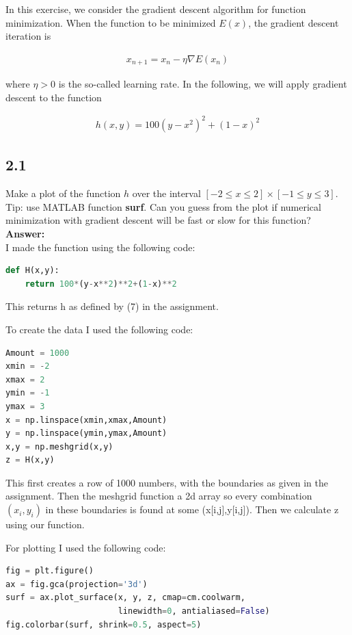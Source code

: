 \documentclass[a4paper]{article}
\begin{document}
In this exercise, we consider the gradient descent algorithm for function minimization. When the function to be minimized $E(x)$, the gradient descent iteration is

\begin{align*}
	x_{n+1} = x_n - \eta \nabla E(x_n)
\end{align*}

where $\eta > 0$ is the so-called learning rate. In the following, we will apply gradient descent to the function

\begin{align*}
	h(x,y) = 100(y - x^2)^2 + (1 - x)^2
\end{align*}

\subsection*{2.1}

Make a plot of the function $h$ over the interval $[-2 \leq x \leq 2] \times [-1 \leq y \leq 3]$. Tip: use MATLAB function \textbf{surf}. Can you guess from the plot if numerical minimization with gradient descent will be fast or slow for this function?\\

\textbf{Answer:}\\

I made the function using the following code:


\begin{lstlisting}[language=Python]
def H(x,y):
    return 100*(y-x**2)**2+(1-x)**2
\end{lstlisting}

This returns h as defined by (7) in the assignment.

To create the data I used the following code:

\begin{lstlisting}[language=Python]
Amount = 1000
xmin = -2
xmax = 2
ymin = -1
ymax = 3
x = np.linspace(xmin,xmax,Amount)
y = np.linspace(ymin,ymax,Amount)
x,y = np.meshgrid(x,y)
z = H(x,y)
\end{lstlisting}

This first creates a row of 1000 numbers, with the boundaries as given in the assignment. Then the meshgrid function a 2d array so every combination $(x_i,y_i)$ in these boundaries is found at some (x[i,j],y[i,j]). Then we calculate z using our function.

For plotting I used the following code:

\begin{lstlisting}[language=Python]
fig = plt.figure()
ax = fig.gca(projection='3d')
surf = ax.plot_surface(x, y, z, cmap=cm.coolwarm,
                       linewidth=0, antialiased=False)
fig.colorbar(surf, shrink=0.5, aspect=5)
\end{lstlisting}
\end{document}
